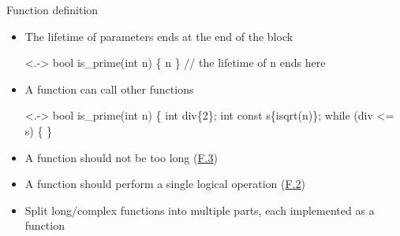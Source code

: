 \begin{frame}[fragile]{Function definition}

  \begin{itemize}[<+->]

  \item The lifetime of parameters ends at the end of the block
    
    \begin{codeblock}<.->{
bool is_prime(int n)
\{
  \ddd n \ddd
\} // the lifetime of n ends here}\end{codeblock}

  \item A function can call other functions

    \begin{codeblock}<.->{
bool is_prime(int n)
\{
  \ddd
  int div\{2\};
  int const s\{\alert{isqrt}(n)\};
  while (div <= s) \{
  \ddd
\}}\end{codeblock}

  \item A function should not be too long
    (\href{https://isocpp.github.io/CppCoreGuidelines/CppCoreGuidelines#f3-keep-functions-short-and-simple}{F.3})

  \item A function should perform a single logical operation
    (\href{https://isocpp.github.io/CppCoreGuidelines/CppCoreGuidelines#f2-a-function-should-perform-a-single-logical-operation}{F.2})

  \item Split long/complex functions into multiple parts, each implemented as a
    function
  \end{itemize}

\end{frame}

